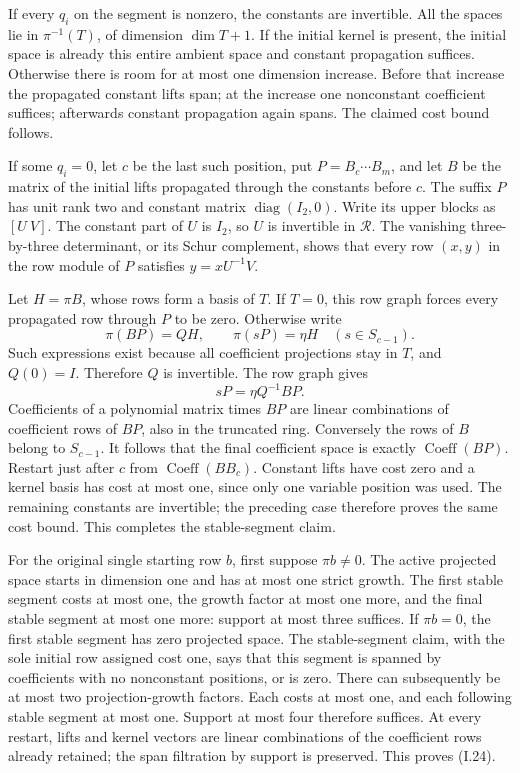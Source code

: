 \documentclass[11pt,a4paper]{article}
\theoremstyle{definition}\newtheorem{definition}{Definition}
\begin{document}
If every $q_i$ on the segment is nonzero, the constants are invertible.
All the spaces lie in $\pi^{-1}(T)$, of dimension $\dim T+1$.
If the initial kernel is present, the initial space is already this
entire ambient space and constant propagation suffices.  Otherwise
there is room for at most one dimension increase.  Before that
increase the propagated constant lifts span; at the increase one
nonconstant coefficient suffices; afterwards constant propagation
again spans.  The claimed cost bound follows.

If some $q_i=0$, let $c$ be the last such position, put
$P=B_c\cdots B_m$, and let $B$ be the matrix of the initial lifts
propagated through the constants before $c$.  The suffix $P$ has
unit rank two and constant matrix $\operatorname{diag}(I_2,0)$.
Write its upper blocks as $[U\ V]$.  The constant part of $U$ is
$I_2$, so $U$ is invertible in $\mathcal R$.  The vanishing
three-by-three determinant, or its Schur complement, shows that
every row $(x,y)$ in the row module of $P$ satisfies
$y=xU^{-1}V$.

Let $H=\pi B$, whose rows form a basis of $T$.  If $T=0$, this row
graph forces every propagated row through $P$ to be zero.  Otherwise
write
\[
 \pi(BP)=QH,\qquad \pi(sP)=\eta H\quad(s\in S_{c-1}).
\]
Such expressions exist because all coefficient projections stay in
$T$, and $Q(0)=I$.  Therefore $Q$ is invertible.  The row graph gives
\[
 sP=\eta Q^{-1}BP.
 \tag{I.26}
\]
Coefficients of a polynomial matrix times $BP$ are linear
combinations of coefficient rows of $BP$, also in the truncated
ring.  Conversely the rows of $B$ belong to $S_{c-1}$.  It follows
that the final coefficient space is exactly
$\operatorname{Coeff}(BP)$.
Restart just after $c$ from $\operatorname{Coeff}(BB_c)$.
Constant lifts have cost zero and a kernel basis has cost at most
one, since only one variable position was used.  The remaining
constants are invertible; the preceding case therefore proves the
same cost bound.  This completes the stable-segment claim.

For the original single starting row $b$, first suppose $\pi b\ne0$.
The active projected space starts in dimension one and has at most
one strict growth.  The first stable segment costs at most one,
the growth factor at most one more, and the final stable segment
at most one more: support at most three suffices.  If $\pi b=0$,
the first stable segment has zero projected space.  The
stable-segment claim, with the sole initial row assigned cost one,
says that this segment is spanned by coefficients with no
nonconstant positions, or is zero.  There can subsequently be at
most two projection-growth factors.  Each costs at most one, and
each following stable segment at most one.  Support at most four
therefore suffices.  At every restart, lifts and kernel vectors
are linear combinations of the coefficient rows already retained;
the span filtration by support is preserved.  This proves (I.24).
\end{document}
